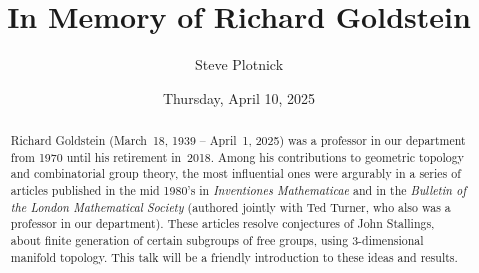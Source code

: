 \documentclass{UAmathtalk}
\author{Steve Plotnick}
\title{In Memory of Richard Goldstein}
\date{Thursday, April 10, 2025}
\begin{document}
\maketitle

\begin{abstract}
Richard Goldstein (March~18, 1939 -- April~1, 2025) was a professor in our department from 1970 until his retirement in~2018.
Among his contributions to geometric topology and combinatorial group theory, the most influential ones were argurably in a series of articles published in the mid 1980’s in \emph{Inventiones Mathematicae} and in the \emph{Bulletin of the London Mathematical Society} (authored jointly with Ted Turner, who also was a professor in our department).
These articles resolve conjectures of John Stallings, about finite generation of certain subgroups of free groups, using 3-dimensional manifold topology.
This talk will be a friendly introduction to these ideas and results.
\end{abstract}
\end{document}
